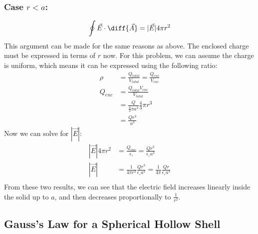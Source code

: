 \documentclass{math}
\begin{document}
\subsubsection*{Case \( r < a \):}
\begin{center}
\end{center}
\[ \oint\vec{E}\cdot\diff{\vec{A}} = |\vec{E}|4\pi r^2 \]
This argument can be made for the same reasons as above. The enclosed charge
must be expressed in terms of \( r \) now. For this problem, we can assume the
charge is uniform, which means it can be expressed using the following ratio:
\begin{align*}
  \rho &= \frac{Q_{total}}{V_{total}} = \frac{Q_{enc}}{V_{enc}} \\
  Q_{enc} &= \frac{Q_{total}V_{enc}}{V_{total}} \\
  &= \frac{Q}{\frac{4}{3}\pi a^3}\frac{4}{3}\pi r^3 \\
  &= \frac{Qr^3}{a^3}
\end{align*}
Now we can solve for \( |\vec{E}| \):
\begin{align*}
  |\vec{E}|4\pi r^2 &= \frac{Q_{enc}}{\epsilon_{\circ}} =
    \frac{Qr^3}{\epsilon_{\circ}a^3} \\
  |\vec{E}| &= \frac{1}{4\pi r^2}\frac{Qr^3}{\epsilon_{\circ}a^3}
    = \frac{1}{4\pi}\frac{Qr}{\epsilon_{\circ}a^3} \\
\end{align*}
From these two results, we can see that the electric field increases linearly
inside the solid up to \( a \), and then decreases proportionally to
\( \frac{1}{r^2} \).

\subsection*{Gauss's Law for a Spherical Hollow Shell}
\end{document}
